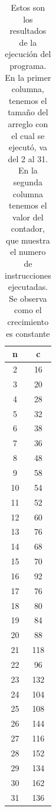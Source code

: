 \documentclass{article}
\begin{document}
    \begin{table}[h!]
            \centering
            \begin{tabular}{| c | c |}
            \hline
            n  & c   \\
            \hline
            2  & 16  \\
            3  & 20  \\
            4  & 28  \\
            5  & 32  \\
            6  & 38  \\
            7  & 36  \\
            8  & 48  \\
            9  & 58  \\
            10 & 54  \\
            11 & 52  \\
            12 & 60  \\
            13 & 76  \\
            14 & 68  \\
            15 & 70  \\
            16 & 92  \\
            17 & 76  \\
            18 & 80  \\
            19 & 84  \\
            20 & 88  \\
            21 & 118 \\
            22 & 96  \\
            23 & 132 \\
            24 & 104 \\
            25 & 108 \\
            26 & 144 \\
            27 & 116 \\
            28 & 152 \\
            29 & 134 \\
            30 & 162 \\
            31 & 136 \\
            \hline
            \end{tabular}
            \caption{Estos son los resultados de la ejecución del programa. En la primer columna, tenemos el tamaño del arreglo con el cual se ejecutó, va del 2 al 31. En la segunda columna tenemos el valor del contador, que muestra el numero de instrucciones ejecutadas. Se observa como el crecimiento es constante}
        \end{table}
        \newpage
        
\end{document}
